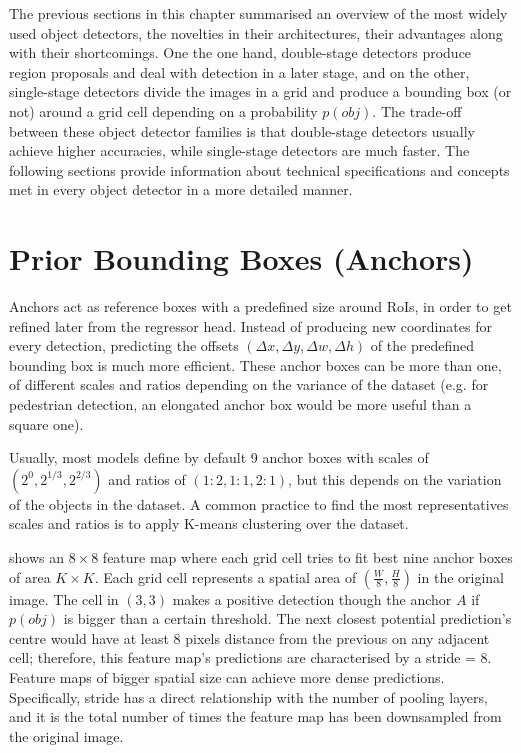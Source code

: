 The previous sections in this chapter summarised an overview of the most widely used object detectors, the novelties in their architectures, their advantages along with their shortcomings. One the one hand, double-stage detectors produce region proposals and deal with detection in a later stage, and on the other, single-stage detectors divide the images in a grid and produce a bounding box (or not) around a grid cell depending on a probability $p(obj)$. The trade-off between these object detector families is that double-stage detectors usually achieve higher accuracies, while single-stage detectors are much faster. The following sections provide information about technical specifications and concepts met in every object detector in a more detailed manner.

\section{Prior Bounding Boxes (Anchors)}
Anchors act as reference boxes with a predefined size around RoIs, in order to get refined later from the regressor head. Instead of producing new coordinates for every detection, predicting the offsets $(\Delta x, \Delta y, \Delta w, \Delta h)$ of the predefined bounding box is much more efficient. These anchor boxes can be more than one, of different scales and ratios depending on the variance of the dataset (e.g. for pedestrian detection, an elongated anchor box would be more useful than a square one).

Usually, most models define by default 9 anchor boxes with scales of $(2^0, 2^{1/3}, 2^{2/3})$ and ratios of $(1\!:\!2,1\!:\!1,2\!:\!1)$, but this depends on the variation of the objects in the dataset. A common practice to find the most representatives scales and ratios is to apply K-means clustering over the dataset.

 shows an $8\times8$ feature map where each grid cell tries to fit best nine anchor boxes of area $K\times K$. Each grid cell represents a spatial area of $(\frac{W}{8}, \frac{H}{8})$ in the original image. The cell in $(3,3)$ makes a positive detection though the anchor $A$ if $p(obj)$ is bigger than a certain threshold. The next closest potential prediction's centre would have at least 8 pixels distance from the previous on any adjacent cell; therefore, this feature map's predictions are characterised by a stride = 8. Feature maps of bigger spatial size can achieve more dense predictions. Specifically, stride has a direct relationship with the number of pooling layers, and it is the total number of times the feature map has been downsampled from the original image.

